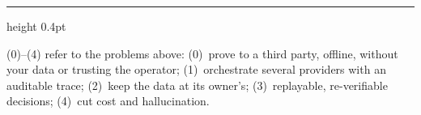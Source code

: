 \documentclass[11pt]{article}
\begin{document}
\enlargethispage{3\baselineskip}
\vspace{4pt}
{\color{efegray}\hrule height 0.4pt}
\vspace{2.5pt}
{\footnotesize\color{efegray}(0)--(4) refer to the problems above: (0)~prove to a third party, offline, without your data or trusting the operator; (1)~orchestrate several providers with an auditable trace; (2)~keep the data at its owner's; (3)~replayable, re-verifiable decisions; (4)~cut cost and hallucination.}
\end{document}
